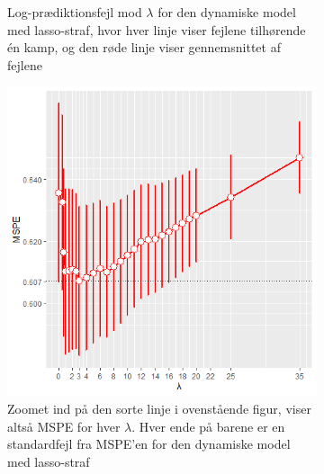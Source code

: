 \documentclass[11pt,a4paper]{article}
\begin{document}
\begin{figure}[h!]
\begin{subfigure}[b]{0.425\linewidth}
    \caption{Log-prædiktionsfejl mod $\lambda$ for den dynamiske model med lasso-straf, hvor hver linje viser fejlene tilhørende én kamp, og den røde linje viser gennemsnittet af fejlene}
    \label{fig:DynLogLossLine}  
    \end{subfigure}
  \begin{subfigure}[b]{0.425\linewidth}
    \includegraphics[width=\textwidth]{BARMSPENYALPHA.png}
    \caption{Zoomet ind på den sorte linje i ovenstående figur, viser altså MSPE for hver $\lambda$. Hver ende på barene er en standardfejl fra MSPE'en for den dynamiske model med lasso-straf}
    \label{fig:MSPEBarDyn}
  \end{subfigure}
      \hspace{0.2cm}
    \begin{subfigure}[b]{0.425\linewidth}

\end{subfigure}
\end{figure}
\end{document}
